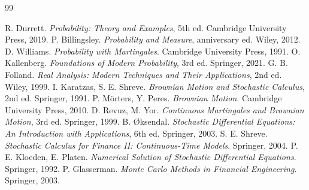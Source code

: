 \begin{thebibliography}{99}
 R. Durrett. \emph{Probability: Theory and Examples}, 5th ed. Cambridge University Press, 2019.
 P. Billingsley. \emph{Probability and Measure}, anniversary ed. Wiley, 2012.
 D. Williams. \emph{Probability with Martingales}. Cambridge University Press, 1991.
 O. Kallenberg. \emph{Foundations of Modern Probability}, 3rd ed. Springer, 2021.
 G. B. Folland. \emph{Real Analysis: Modern Techniques and Their Applications}, 2nd ed. Wiley, 1999.
 I. Karatzas, S. E. Shreve. \emph{Brownian Motion and Stochastic Calculus}, 2nd ed. Springer, 1991.
 P. M\"orters, Y. Peres. \emph{Brownian Motion}. Cambridge University Press, 2010.
 D. Revuz, M. Yor. \emph{Continuous Martingales and Brownian Motion}, 3rd ed. Springer, 1999.
 B. \O ksendal. \emph{Stochastic Differential Equations: An Introduction with Applications}, 6th ed. Springer, 2003.
 S. E. Shreve. \emph{Stochastic Calculus for Finance II: Continuous-Time Models}. Springer, 2004.
 P. E. Kloeden, E. Platen. \emph{Numerical Solution of Stochastic Differential Equations}. Springer, 1992.
 P. Glasserman. \emph{Monte Carlo Methods in Financial Engineering}. Springer, 2003.
\end{thebibliography}
